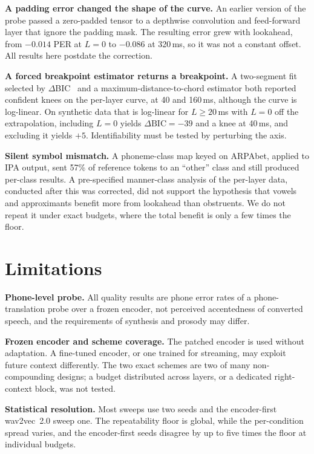 \documentclass[journal]{IEEEtran}
\begin{document}
\textbf{A padding error changed the shape of the curve.} An earlier version
of the probe passed a zero-padded tensor to a depthwise convolution and
feed-forward layer that ignore the padding mask. The resulting error grew
with lookahead, from $-0.014$ PER at $L=0$ to $-0.086$ at 320\,ms, so it was
not a constant offset. All results here postdate the correction.

\textbf{A forced breakpoint estimator returns a breakpoint.} A two-segment fit
selected by $\Delta$BIC~\cite{kassraftery1995} and a
maximum-distance-to-chord estimator both reported confident knees on the
per-layer curve, at 40 and 160\,ms, although the curve is log-linear. On
synthetic data that is log-linear for $L\ge20$\,ms with $L=0$ off the
extrapolation, including $L=0$ yields $\Delta\mathrm{BIC}=-39$ and a knee at
40\,ms, and excluding it yields $+5$. Identifiability must be tested by
perturbing the axis.

\textbf{Silent symbol mismatch.} A phoneme-class map keyed on ARPAbet, applied
to IPA output, sent 57\% of reference tokens to an ``other'' class and still
produced per-class results. A pre-specified manner-class analysis of the
per-layer data, conducted after this was corrected, did not support the
hypothesis that vowels and approximants benefit more from lookahead than
obstruents. We do not repeat it under exact budgets, where the total benefit
is only a few times the floor.

\section{Limitations}
\label{sec:limitations}

\textbf{Phone-level probe.} All quality results are phone error rates of a
phone-translation probe over a frozen encoder, not perceived accentedness of
converted speech, and the requirements of synthesis and prosody may differ.

\textbf{Frozen encoder and scheme coverage.} The patched encoder is used
without adaptation. A fine-tuned encoder, or one trained for streaming, may
exploit future context differently. The two exact schemes are two of many
non-compounding designs; a budget distributed across layers, or a dedicated
right-context block, was not tested.

\textbf{Statistical resolution.} Most sweeps use two seeds and the
encoder-first wav2vec~2.0 sweep one. The repeatability floor is global, while
the per-condition spread varies, and the encoder-first seeds disagree by up to
five times the floor at individual budgets.
\end{document}
